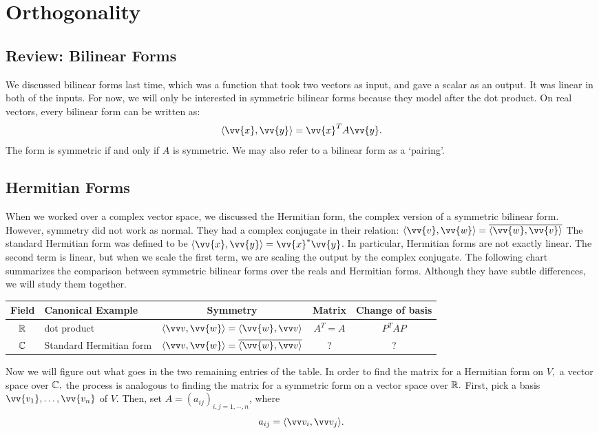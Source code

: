 
\section{Orthogonality}
\subsection{Review: Bilinear Forms}
We discussed bilinear forms last time, which was a function that took two vectors as input, and gave a scalar as an output. 
It was linear in both of the inputs.
For now, we will only be interested in symmetric bilinear forms because they model after the dot product. 
On real vectors, every bilinear form can be written as:
\[ \langle \vv{x}, \vv{y} \rangle = \vv{x}^T A \vv{y}.\]
The form is symmetric if and only if $A$ is symmetric. 
We may also refer to a bilinear form as a `pairing'. 

\subsection{Hermitian Forms}

When we worked over a complex vector space, we discussed the Hermitian form, the complex version of a symmetric bilinear form. However, symmetry did not work as normal. 
They had a complex conjugate in their relation: $\langle \vv{v}, \vv{w} \rangle = \overline{\langle \vv{w}, \vv{v}\rangle}$
The standard Hermitian form was defined to be $\langle \vv{x}, \vv{y} \rangle = \vv{x}^* \vv{y}$.
In particular, Hermitian forms are not exactly linear.
The second term is linear, but when we scale the first term, we are scaling the output by the complex conjugate.
The following chart summarizes the comparison between symmetric bilinear forms over the reals and Hermitian forms.
Although they have subtle differences, we will study them together. 
\begin{center}
\begin{tabular}{|c|p{3.27cm}|c|c|c|}
    \hline
    Field & Canonical Example& Symmetry & Matrix & Change of basis \\
    \hline
    $\mathbb R$ & dot product & $\langle \vvv, \vv{w} \rangle = \langle \vv{w}, \vvv\rangle $ & $A^T = A$ & $P^T A P $\\
    \hline
    \rule{0pt}{4ex} $\mathbb C$ & Standard Hermitian form & $\langle \vvv, \vv{w} \rangle = \overline{\langle \vv{w}, \vvv \rangle }$ &? & ?\\

    \hline
\end{tabular}
\end{center}
Now we will figure out what goes in the two remaining entries of the table. 
In order to find the matrix for a Hermitian form on $V,$ a vector space over $\mathbb C,$ the process is analogous to finding the matrix for a symmetric form on a vector space over $\mathbb R.$ First, pick a basis $\vv{v_1}, \ldots, \vv{v_n}$ of $V.$ Then, set $A = (a_{ij})_{i, j = 1, \cdots, n}$, where 
\[
a_{ij} = \langle \vvv_i, \vvv_j \rangle.
\]

